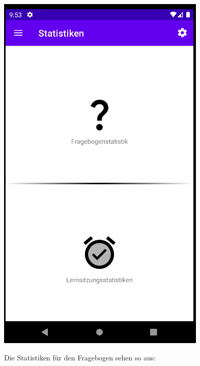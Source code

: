 \documentclass{article}
\begin{document}
\begin{center}
    \includegraphics[scale=0.45]{stats_start.png}
\end{center}
Die Statistiken für den Fragebogen sehen so aus:
\end{document}
